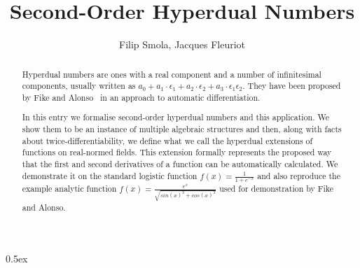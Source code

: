 \documentclass[11pt,a4paper]{article}
\begin{document}
\title{Second-Order Hyperdual Numbers}
\author{Filip Smola, Jacques Fleuriot}
\maketitle

\begin{abstract}
  Hyperdual numbers are ones with a real component and a number of infinitesimal components, usually written as $a_0 + a_1 \cdot \epsilon_1 + a_2 \cdot \epsilon_2 + a_3 \cdot \epsilon_1\epsilon_2$.
  They have been proposed by Fike and Alonso~\cite{fike_alonso-2011} in an approach to automatic differentiation.

  In this entry we formalise second-order hyperdual numbers and this application.
  We show them to be an instance of multiple algebraic structures and then, along with facts about twice-differentiability, we define what we call the hyperdual extensions of functions on real-normed fields.
  This extension formally represents the proposed way that the first and second derivatives of a function can be automatically calculated.
  We demonstrate it on the standard logistic function $f(x) = \frac{1}{1 + e^{-x}}$ and also reproduce the example analytic function $f(x) = \frac{e^x}{\sqrt{sin(x)^3 + cos(x)^3}}$ used for demonstration by Fike and Alonso.
\end{abstract}

\tableofcontents

\parindent 0pt\parskip 0.5ex





\end{document}
